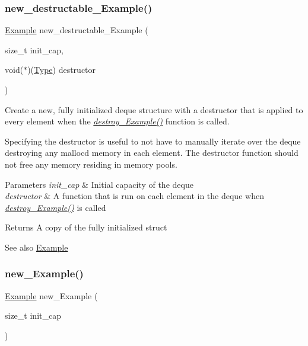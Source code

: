 \subsubsection{\texorpdfstring{new\+\_\+destructable\+\_\+\+Example()}{new\_destructable\_Example()}}
{\footnotesize\ttfamily \hyperlink{structExample}{Example} new\+\_\+destructable\+\_\+\+Example (\begin{DoxyParamCaption}\item[{size\+\_\+t}]{init\+\_\+cap,  }\item[{void($\ast$)(\hyperlink{group__DEQUE_gac9c83c2070eb6b5891cf742b90f54c68}{Type})}]{destructor }\end{DoxyParamCaption})}



Create a new, fully initialized deque structure with a destructor that is applied to every element when the {\itshape \hyperlink{group__DEQUE_gad9998ed1cadaff66c209e8b666185f70}{destroy\+\_\+\+Example()}} function is called. 

Specifying the destructor is useful to not have to manually iterate over the deque destroying any malloc\textquotesingle{}d memory in each element. The destructor function should not free any memory residing in memory pools.


\begin{DoxyParams}{Parameters}
{\em init\+\_\+cap} & Initial capacity of the deque\\
\hline
{\em destructor} & A function that is run on each element in the deque when {\itshape \hyperlink{group__DEQUE_gad9998ed1cadaff66c209e8b666185f70}{destroy\+\_\+\+Example()}} is called\\
\hline
\end{DoxyParams}
\begin{DoxyReturn}{Returns}
A copy of the fully initialized struct
\end{DoxyReturn}
\begin{DoxySeeAlso}{See also}
\hyperlink{structExample}{Example} 
\end{DoxySeeAlso}
\mbox{\label{group__DEQUE_gae0c6f52c89e2b087e19e3062186144da}} 
\subsubsection{\texorpdfstring{new\+\_\+\+Example()}{new\_Example()}}
{\footnotesize\ttfamily \hyperlink{structExample}{Example} new\+\_\+\+Example (\begin{DoxyParamCaption}\item[{size\+\_\+t}]{init\+\_\+cap }\end{DoxyParamCaption})}




